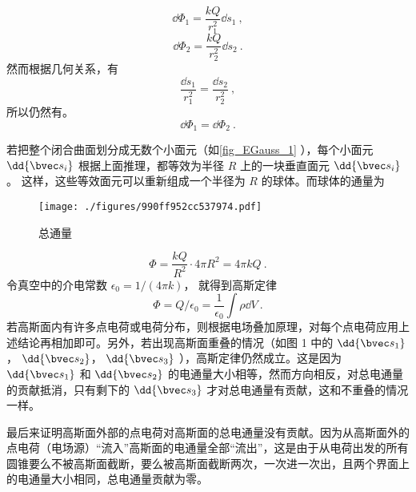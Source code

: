 \begin{equation}
\dd{\Phi_1} = \frac{kQ}{r_1^2} \dd{s_1}~,
\end{equation}
\begin{equation}
\dd{\Phi_2} = \frac{kQ}{r_2^2} \dd{s_2}~.
\end{equation}
然而根据几何关系，有
\begin{equation}
\frac{\dd{s_1}}{r_1^2} = \frac{\dd{s_2}}{r_2^2}~,
\end{equation} 
所以仍然有。
\begin{equation}
\dd{\Phi_1} = \dd{\Phi_2}~.
\end{equation} 

若把整个闭合曲面划分成无数个小面元（如\autoref{fig_EGauss_1} ），每个小面元 $\dd{\bvec s_i}$ 根据上面推理，都等效为半径 $R$ 上的一块垂直面元 $\dd{\bvec s_i}$。 这样，这些等效面元可以重新组成一个半径为 $R$ 的球体。而球体的通量为
\begin{figure}[ht]
\centering
\texttt{[image: ./figures/990ff952cc537974.pdf]}
\caption{总通量}\label{fig_EGauss_1}
\end{figure}

\begin{equation}
\Phi  = \frac{kQ}{R^2} \cdot 4\pi R^2 = 4\pi kQ~.
\end{equation} 
令真空中的介电常数 $\epsilon_0 = 1/(4\pi k)$， 就得到高斯定律
\begin{equation}
\Phi  = Q/\epsilon_0 = \frac{1}{\epsilon_0} \int \rho \dd{V}~.
\end{equation} 
若高斯面内有许多点电荷或电荷分布，则根据电场叠加原理，对每个点电荷应用上述结论再相加即可。另外，若出现高斯面重叠的情况（如图 1 中的 $\dd{\bvec s_1}$，  $\dd{\bvec s_2}$，  $\dd{\bvec s_3}$ ），高斯定律仍然成立。这是因为 $\dd{\bvec s_1}$ 和 $\dd{\bvec s_2}$ 的电通量大小相等，然而方向相反，对总电通量的贡献抵消，只有剩下的 $\dd{\bvec s_3}$ 才对总电通量有贡献，这和不重叠的情况一样。

最后来证明高斯面外部的点电荷对高斯面的总电通量没有贡献。因为从高斯面外的点电荷（电场源）“流入”高斯面的电通量全部“流出”，这是由于从电荷出发的所有圆锥要么不被高斯面截断，要么被高斯面截断两次，一次进一次出，且两个界面上的电通量大小相同，总电通量贡献为零。
 